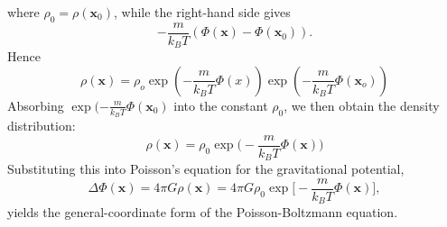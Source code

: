 \documentclass[12pt,a4paper]{article}
\numberwithin{equation}{section}
\begin{document}
where $\rho_0 = \rho(\mathbf{x}_0)$, while the right-hand side gives
\begin{equation*}
- \frac{m}{k_B T} (\Phi(\mathbf{x}) - \Phi(\mathbf{x}_0)).
\end{equation*}
Hence
\begin{equation}
\rho(\mathbf{x})=\rho_{o}\exp\left(-\frac{m}{k_{B}T}\Phi(x)\right)\exp\left(-\frac{m}{k_{B}T}\Phi(\mathbf{x}_{o})
\right)
\end{equation}
Absorbing $\exp(-\frac{m}{k_{B}T}\Phi(\mathbf{x}_0)$ into the constant $\rho_0$, we then obtain the density distribution:
\begin{equation}
\rho(\mathbf{x}) = \rho_0 \exp\Big(-\frac{m}{k_B T} \Phi(\mathbf{x})\Big)
\end{equation}
Substituting this into Poisson's equation for the gravitational potential,
\begin{equation}
\Delta \Phi(\mathbf{x}) = 4 \pi G \rho(\mathbf{x}) = 4 \pi G \rho_0 \exp\Big[-\frac{m}{k_B T} \Phi(\mathbf{x})\Big],
\end{equation}
yields the general-coordinate form of the Poisson-Boltzmann equation.
\end{document}
